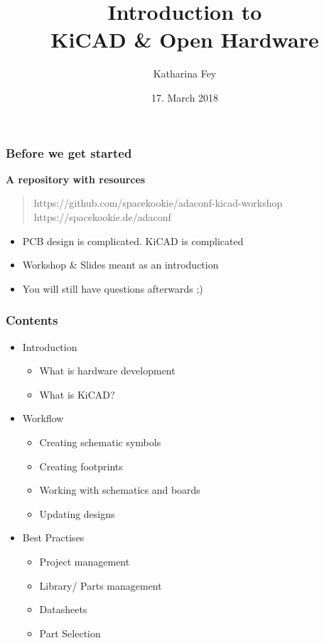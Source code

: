 \documentclass{beamer}
\begin{document}
\title{Introduction to\\KiCAD \& Open Hardware}
\author{Katharina Fey}
\date{17. March 2018}

\frame{\titlepage}


\begin{frame}
  \frametitle{Before we get started}

  \textbf{A repository with resources}

  \begin{quote}
    https://github.com/spacekookie/adaconf-kicad-workshop\\
     https://spacekookie.de/adaconf \\
  \end{quote}

  \begin{itemize}
    \item PCB design is complicated. KiCAD is complicated
    \item Workshop \& Slides meant as an introduction
    \item You will still have questions afterwards ;)
  \end{itemize}
\end{frame}



\begin{frame}
  \frametitle{Contents}
  \begin{itemize}
    \item Introduction
    \begin{itemize}
      \item What is hardware development
      \item What is KiCAD?
    \end{itemize}
    \item Workflow
    \begin{itemize}
      \item Creating schematic symbols
      \item Creating footprints
      \item Working with schematics and boards
      \item Updating designs
    \end{itemize}
    \item Best Practises
    \begin{itemize}
      \item Project management
      \item Library/ Parts management
      \item Datasheets
      \item Part Selection
    \end{itemize}
  \end{itemize}
\end{frame}
\end{document}
